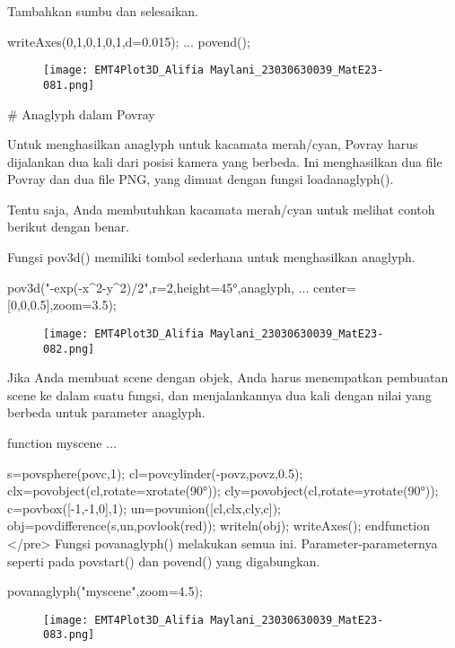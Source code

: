 \documentclass{article}
\begin{document}
Tambahkan sumbu dan selesaikan.


\>writeAxes(0,1,0,1,0,1,d=0.015); ...  
\>   povend();


\begin{figure}
    \centering
    \texttt{[image: EMT4Plot3D\_Alifia Maylani\_23030630039\_MatE23-081.png]}
    \caption{}
    \label{fig:enter-label}
\end{figure}

# Anaglyph dalam Povray

Untuk menghasilkan anaglyph untuk kacamata merah/cyan, Povray harus
dijalankan dua kali dari posisi kamera yang berbeda. Ini menghasilkan
dua file Povray dan dua file PNG, yang dimuat dengan fungsi
loadanaglyph().


Tentu saja, Anda membutuhkan kacamata merah/cyan untuk melihat contoh
berikut dengan benar.


Fungsi pov3d() memiliki tombol sederhana untuk menghasilkan anaglyph.


\>pov3d("-exp(-x^2-y^2)/2",r=2,height=45°,\>anaglyph, ...  
\>     center=[0,0,0.5],zoom=3.5);


\begin{figure}
    \centering
    \texttt{[image: EMT4Plot3D\_Alifia Maylani\_23030630039\_MatE23-082.png]}
    \caption{}
    \label{fig:enter-label}
\end{figure}

Jika Anda membuat scene dengan objek, Anda harus menempatkan pembuatan
scene ke dalam suatu fungsi, dan menjalankannya dua kali dengan nilai
yang berbeda untuk parameter anaglyph.


\>function myscene ...


      s=povsphere(povc,1);
      cl=povcylinder(-povz,povz,0.5);
      clx=povobject(cl,rotate=xrotate(90°));
      cly=povobject(cl,rotate=yrotate(90°));
      c=povbox([-1,-1,0],1);
      un=povunion([cl,clx,cly,c]);
      obj=povdifference(s,un,povlook(red));
      writeln(obj);
      writeAxes();
    endfunction
</pre>
Fungsi povanaglyph() melakukan semua ini. Parameter-parameternya
seperti pada povstart() dan povend() yang digabungkan.


\>povanaglyph("myscene",zoom=4.5);


\begin{figure}
    \centering
    \texttt{[image: EMT4Plot3D\_Alifia Maylani\_23030630039\_MatE23-083.png]}
    \caption{}
    \label{fig:enter-label}
\end{figure}
\end{document}
